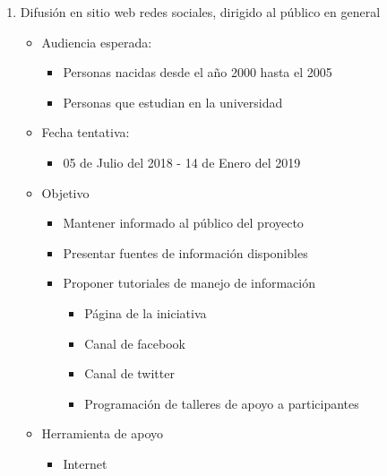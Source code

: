 \documentclass{article}
\begin{document}
\begin{enumerate}
\item Difusión en sitio web redes sociales, dirigido al público en general 
\begin{itemize}
\item Audiencia esperada:
\begin{itemize}
\item Personas nacidas desde el año 2000 hasta el 2005
\item Personas que estudian en la universidad
\end{itemize}
\item Fecha tentativa:
\begin{itemize}
\item 05 de Julio del 2018 - 14 de Enero del 2019
\end{itemize}
\item Objetivo
\begin{itemize}
\item Mantener informado al público del proyecto
\item Presentar fuentes de información disponibles
\item Proponer tutoriales de manejo de información
\begin{itemize}
\item Página de la iniciativa 
\item Canal de facebook
\item Canal de twitter
\item Programación de talleres de apoyo a participantes
\end{itemize}
\end{itemize}
\item Herramienta de apoyo
\begin{itemize}
\item Internet
\end{itemize}
\end{itemize}


\end{enumerate}
\end{document}
